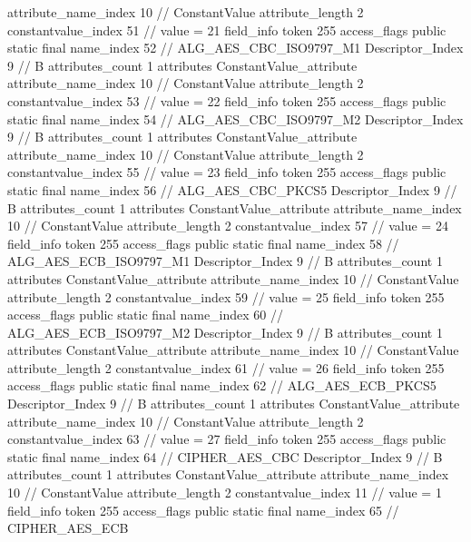 {{{{{{{					attribute_name_index	10		// ConstantValue
					attribute_length	2
					constantvalue_index	51		// value = 21
				}
				}
			}
			field_info {
				token	255
				access_flags	public static final
				name_index	52		// ALG_AES_CBC_ISO9797_M1
				Descriptor_Index	9		// B
				attributes_count	1
				attributes {
				ConstantValue_attribute {
					attribute_name_index	10		// ConstantValue
					attribute_length	2
					constantvalue_index	53		// value = 22
				}
				}
			}
			field_info {
				token	255
				access_flags	public static final
				name_index	54		// ALG_AES_CBC_ISO9797_M2
				Descriptor_Index	9		// B
				attributes_count	1
				attributes {
				ConstantValue_attribute {
					attribute_name_index	10		// ConstantValue
					attribute_length	2
					constantvalue_index	55		// value = 23
				}
				}
			}
			field_info {
				token	255
				access_flags	public static final
				name_index	56		// ALG_AES_CBC_PKCS5
				Descriptor_Index	9		// B
				attributes_count	1
				attributes {
				ConstantValue_attribute {
					attribute_name_index	10		// ConstantValue
					attribute_length	2
					constantvalue_index	57		// value = 24
				}
				}
			}
			field_info {
				token	255
				access_flags	public static final
				name_index	58		// ALG_AES_ECB_ISO9797_M1
				Descriptor_Index	9		// B
				attributes_count	1
				attributes {
				ConstantValue_attribute {
					attribute_name_index	10		// ConstantValue
					attribute_length	2
					constantvalue_index	59		// value = 25
				}
				}
			}
			field_info {
				token	255
				access_flags	public static final
				name_index	60		// ALG_AES_ECB_ISO9797_M2
				Descriptor_Index	9		// B
				attributes_count	1
				attributes {
				ConstantValue_attribute {
					attribute_name_index	10		// ConstantValue
					attribute_length	2
					constantvalue_index	61		// value = 26
				}
				}
			}
			field_info {
				token	255
				access_flags	public static final
				name_index	62		// ALG_AES_ECB_PKCS5
				Descriptor_Index	9		// B
				attributes_count	1
				attributes {
				ConstantValue_attribute {
					attribute_name_index	10		// ConstantValue
					attribute_length	2
					constantvalue_index	63		// value = 27
				}
				}
			}
			field_info {
				token	255
				access_flags	public static final
				name_index	64		// CIPHER_AES_CBC
				Descriptor_Index	9		// B
				attributes_count	1
				attributes {
				ConstantValue_attribute {
					attribute_name_index	10		// ConstantValue
					attribute_length	2
					constantvalue_index	11		// value = 1
				}
				}
			}
			field_info {
				token	255
				access_flags	public static final
				name_index	65		// CIPHER_AES_ECB
}}}}}
